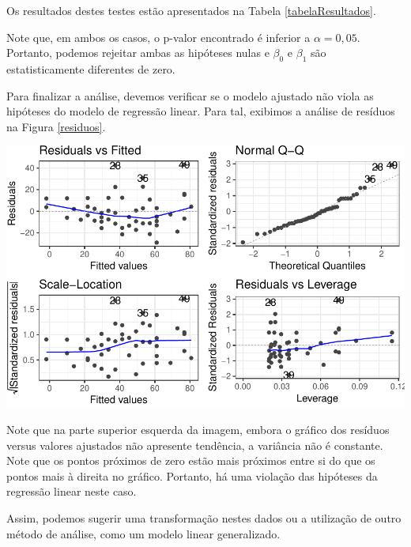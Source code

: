\documentclass[a4paper,12pt,twoside,printwatermark=false]{modeloLEA}
\numberwithin{equation}{section}
\numberwithin{figure}{section}
\numberwithin{table}{section}
\begin{document}
\noindent Os resultados destes testes estão apresentados na Tabela
\ref{tabelaResultados}.

Note que, em ambos os casos, o p-valor encontrado é inferior a
\(\alpha = 0,05\). Portanto, podemos rejeitar ambas as hipóteses nulas e
\(\beta_0\) e \(\beta_1\) são estatisticamente diferentes de zero.

Para finalizar a análise, devemos verificar se o modelo ajustado não
viola as hipóteses do modelo de regressão linear. Para tal, exibimos a
análise de resíduos na Figura \ref{residuos}.

\begin{Shaded}
\begin{Highlighting}[]
\end{Highlighting}
\end{Shaded}

\begin{center}\includegraphics{Untitled_files/figure-latex/residuos-1} \end{center}

Note que na parte superior esquerda da imagem, embora o gráfico dos
resíduos versus valores ajustados não apresente tendência, a variância
não é constante. Note que os pontos próximos de zero estão mais próximos
entre si do que os pontos mais à direita no gráfico. Portanto, há uma
violação das hipóteses da regressão linear neste caso.

Assim, podemos sugerir uma transformação nestes dados ou a utilização de
outro método de análise, como um modelo linear generalizado.





\end{document}
